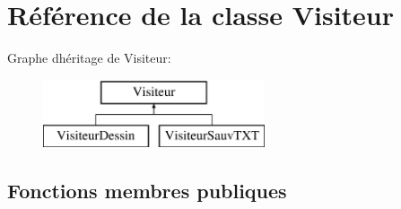 \hypertarget{class_visiteur}{}\section{Référence de la classe Visiteur}
\label{class_visiteur}
Graphe d\textquotesingle{}héritage de Visiteur\+:\begin{figure}[H]
\begin{center}
\leavevmode
\includegraphics[height=2.000000cm]{class_visiteur}
\end{center}
\end{figure}
\subsection*{Fonctions membres publiques}
